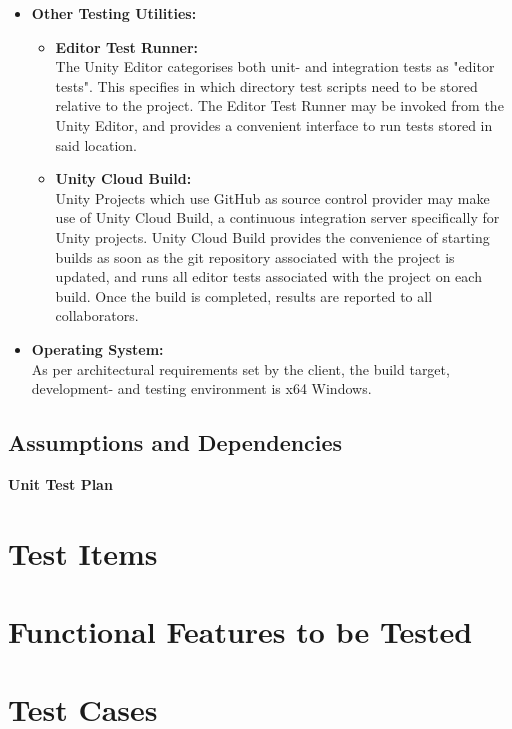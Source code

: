 \documentclass[a4paper,12pt]{article}
\begin{document}
\begin{itemize}
\begin{itemize}
			\end{itemize}
		\item \textbf{Other Testing Utilities:}
			\begin{itemize}
				\item \textbf{Editor Test Runner:}\\
				The Unity Editor categorises both unit- and integration tests as "editor tests". This specifies in which directory test scripts need to be stored relative to the project. The Editor Test Runner may be invoked from the Unity Editor, and provides a convenient interface to run tests stored in said location.
				\item \textbf{Unity Cloud Build:}\\
				Unity Projects which use GitHub as source control provider may make use of Unity Cloud Build, a continuous integration server specifically for Unity projects. Unity Cloud Build provides the convenience of starting builds as soon as the git repository associated with the project is updated, and runs all editor tests associated with the project on each build. Once the build is completed, results are reported to all collaborators.
			\end{itemize}
		\item \textbf{Operating System:}\\
		As per architectural requirements set by the client, the build target, development- and testing environment is x64 Windows.
	\end{itemize}
\subsection{Assumptions and Dependencies}

\newpage

\begin{center}
	\huge \bfseries Unit Test Plan \\[2cm]
\end{center}

\section{Test Items}

\section{Functional Features to be Tested}

\section{Test Cases}
\end{document}
